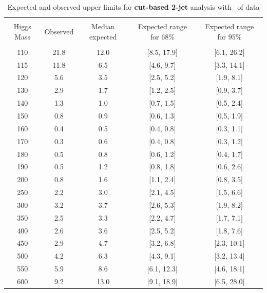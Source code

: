 \begin{table}[!hbp]
\begin{center}
\begin{tabular}{c c c c c}
\hline
\vspace{-3mm} && \\
Higgs Mass & Observed & Median expected & Expected range for 68\% & Expected range for 95\%   \\
\vspace{-3mm} && \\
\hline
110 & 21.8 & 12.0 & [8.5, 17.9] & [6.1, 26.2] \\
115 & 11.8 & 6.5 & [4.6, 9.7] & [3.3, 14.1] \\
120 & 5.6 & 3.5 & [2.5, 5.2] & [1.9, 8.1] \\
130 & 2.9 & 1.7 & [1.2, 2.5] & [0.9, 3.7] \\
140 & 1.3 & 1.0 & [0.7, 1.5] & [0.5, 2.4] \\
150 & 0.8 & 0.9 & [0.6, 1.3] & [0.5, 1.9] \\
160 & 0.4 & 0.5 & [0.4, 0.8] & [0.3, 1.1] \\
170 & 0.3 & 0.6 & [0.4, 0.8] & [0.3, 1.2] \\
180 & 0.5 & 0.8 & [0.6, 1.2] & [0.4, 1.7] \\
190 & 0.5 & 1.2 & [0.8, 1.8] & [0.6, 2.6] \\
200 & 0.8 & 1.6 & [1.1, 2.4] & [0.8, 3.5] \\
250 & 2.2 & 3.0 & [2.1, 4.5] & [1.5, 6.6] \\
300 & 3.2 & 3.7 & [2.6, 5.3] & [1.9, 8.2] \\
350 & 2.5 & 3.3 & [2.2, 4.7] & [1.7, 7.1] \\
400 & 2.6 & 3.6 & [2.5, 5.2] & [1.8, 7.6] \\
450 & 2.9 & 4.7 & [3.2, 6.8] & [2.3, 10.1] \\
500 & 4.2 & 6.3 & [4.3, 9.1] & [3.2, 13.4] \\
550 & 5.9 & 8.6 & [6.1, 12.3] & [4.6, 18.1] \\
600 & 9.2 & 13.0 & [9.1, 18.9] & [6.5, 28.0] \\
\hline
\end{tabular}
\caption{Expected and observed upper limits for {\bf cut-based 2-jet}
  analysis with \intlumi\ of data}
\label{tab:vbf_cut}
\end{center}
\end{table}

